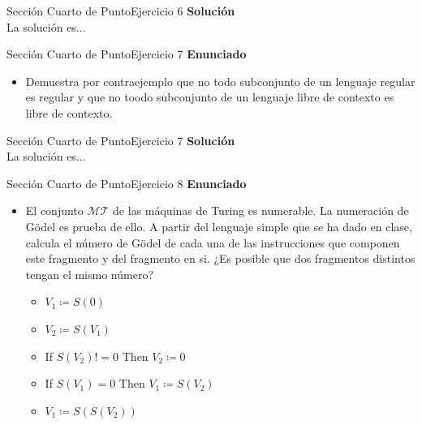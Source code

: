 \documentclass[10pt, envcountsect, presentation, aspectratio=169]{beamer}
\newcommand{\mt}{\ensuremath{\mathcal {MT}}}
\begin{document}

\begin{frame}{Sección Cuarto de Punto}{Ejercicio 6}
    \textbf{Solución}\\
    La solución es...
\end{frame}


\begin{frame}{Sección Cuarto de Punto}{Ejercicio 7}
\textbf{Enunciado}
	\begin{itemize}
        \item Demuestra por contraejemplo que no todo subconjunto de un lenguaje regular es regular y que no toodo subconjunto de un lenguaje libre de contexto es libre de contexto.
    \end{itemize}
\end{frame}


\begin{frame}{Sección Cuarto de Punto}{Ejercicio 7}
    \textbf{Solución}\\
    La solución es...
\end{frame}


\begin{frame}{Sección Cuarto de Punto}{Ejercicio 8}
    \textbf{Enunciado}
    \begin{itemize}
        \item El conjunto $\mt$ de las máquinas de Turing es numerable. La numeración de Gödel es prueba de ello. A partir del lenguaje simple que se ha dado en clase, calcula el número de Gödel de cada una de las instrucciones que componen este fragmento y del fragmento en si. ¿Es posible que dos fragmentos distintos tengan el mismo número?
        \begin{itemize}
            \item[] $V_1 \coloneqq S(0)$
            \item[] $V_2 \coloneqq S(V_1)$
            \item[] If $S(V_2)!=0$ Then $V_2 \coloneqq0$
            \item[] If $S(V_1)=0$ Then $V_1 \coloneqq S(V_2)$
            \item[] $V_1 \coloneqq S(S(V_2))$
        \end{itemize}
    \end{itemize}
\end{frame}
\end{document}

